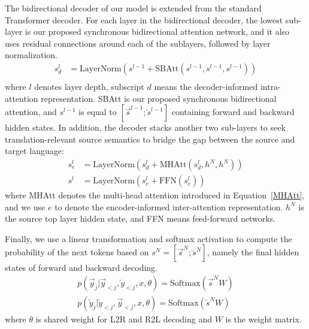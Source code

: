 \documentclass[11pt,a4paper]{article}
\begin{document}
\begin{CJK*}{UTF8}{gbsn}
The bidirectional decoder of our model is extended from the standard Transformer decoder.
For each layer in the bidirectional decoder, the lowest sub-layer is our proposed synchronous bidirectional attention network, and it also uses residual connections around each of the sublayers, followed by layer normalization.
\begin{equation}
\begin{aligned}
  s^l_d &= {\mbox{LayerNorm}}(s^{l-1} + {\mbox{SBAtt}}(s^{l-1},s^{l-1},s^{l-1})) \\
\end{aligned}
\end{equation}
where $l$ denotes layer depth, subscript $d$ means the decoder-informed intra-attention representation. SBAtt is our proposed synchronous bidirectional attention, and $s^{l-1}$ is equal to $[\overrightarrow{s}^{l-1};\overleftarrow{s}^{l-1}]$ containing forward and backward hidden states.
In addition, the decoder stacks another two sub-layers to seek translation-relevant source semantics to bridge the gap between the source and target language:
\begin{equation}
\begin{aligned}
  s^l_e &= {\mbox{LayerNorm}}(s^{l}_d + {\mbox{MHAtt}}(s^{l}_d, h^N,h^N)) \\
  s^l &= {\mbox{LayerNorm}}(s^l_e + {\mbox{FFN}}(s^l_e))
\end{aligned}
\end{equation}
where MHAtt denotes the multi-head attention introduced in Equation~\ref{MHAtt}, and we use $e$ to denote the encoder-informed inter-attention representation. $h^N$ is the source top layer hidden state, and FFN means feed-forward networks.

Finally, we use a linear transformation and softmax activation to compute the probability of the next tokens based on $s^N=[\overrightarrow{s}^N;\overleftarrow{s}^N]$, namely the final hidden states of forward and backward decoding.
\begin{equation}
\begin{aligned}
    p(\overrightarrow{y}_{j}|\overrightarrow{y}_{<j},\overleftarrow{y}_{<j},x,\theta) = \mbox{Softmax}(\overrightarrow{s}^NW)  \\
    p(\overleftarrow{y}_{j}|\overleftarrow{y}_{<j},\overrightarrow{y}_{<j},x,\theta) = \mbox{Softmax}(\overleftarrow{s}^NW)
\end{aligned}
\end{equation}
where $\theta$ is shared weight for L2R and R2L decoding and $W$ is the weight matrix.



\end{CJK*}
\end{document}
